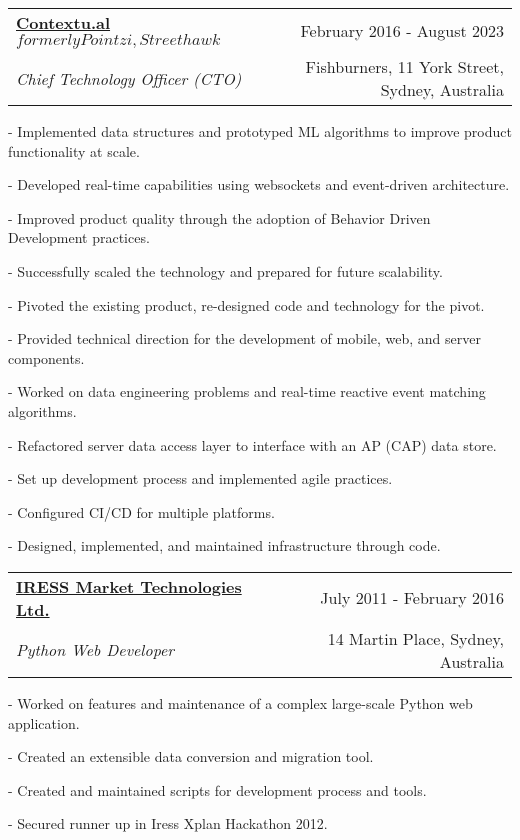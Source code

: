 \documentclass[12pt]{article}
\makeatletter
\newcommand{\employer}[4]{ 
        \vspace*{6pt}
	\begin{tabular*}{\textwidth}{l@{\extracolsep{\fill}}r}
	\textbf{#1} & #2 \\
                #3  & #4 \\ 
	\end{tabular*}
}
\newenvironment{achievements}{
        \vspace{-0pt}
        \begin{list}
        {}
        {\topsep 0pt \itemsep -3pt}
}
{
        \end{list}
}
\makeatother
\begin{document}
\employer{\href{http://www.contextu.al/}{Contextu.al \(formerly Pointzi,Streethawk\)}}{February 2016 - August 2023}{\emph{Chief Technology Officer (CTO)}} {Fishburners, 11 York Street, Sydney, Australia}
    \begin{achievements}
        \item[-] Implemented data structures and prototyped ML algorithms to improve product functionality at scale.
        \item[-] Developed real-time capabilities using websockets and event-driven architecture.
        \item[-] Improved product quality through the adoption of Behavior Driven Development practices.
        \item[-] Successfully scaled the technology and prepared for future scalability.
        \item[-] Pivoted the existing product, re-designed code and technology for the pivot.
        \item[-] Provided technical direction for the development of mobile, web, and server components.
        \item[-] Worked on data engineering problems and real-time reactive event matching algorithms.
        \item[-] Refactored server data access layer to interface with an AP (CAP) data store.
        \item[-] Set up development process and implemented agile practices.
        \item[-] Configured CI/CD for multiple platforms.
        \item[-] Designed, implemented, and maintained infrastructure through code.
    \end{achievements}

\employer{\href{http://www.iress.com/}{IRESS Market Technologies Ltd.}}{July 2011 - February 2016}{\emph{Python Web Developer}} {14 Martin Place, Sydney, Australia}
	\begin{achievements}
        \item[-] Worked on features and maintenance of a complex large-scale Python web application.
        \item[-] Created an extensible data conversion and migration tool.
        \item[-] Created and maintained scripts for development process and tools.
        \item[-] Secured runner up in Iress Xplan Hackathon 2012.
	\end{achievements}
\end{document}
